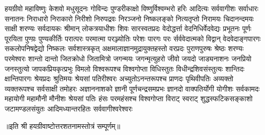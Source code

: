 
\twolineshloka
{हयग्रीवो महाविष्णुः केशवो मधुसूदनः}
{गोविन्दः पुण्डरीकाक्षो विष्णुर्विश्वम्भरो हरिः}
\twolineshloka
{आदित्यः सर्ववागीशः सर्वाधारः सनातनः}
{निराधारो निराकारो निरीशो निरुपद्रवः}
\twolineshloka
{निरञ्जनो  निष्कलङ्को नित्यतृप्तो निरामयः}
{चिदानन्दमयः साक्षी शरण्यः सर्वदायकः}
\twolineshloka
{श्रीमान् लोकत्रयाधीशः शिवः सारस्वतप्रदः}
{वेदोद्धर्त्ता वेदनिधिर्वेदवेद्यः प्रभूतनः}
\twolineshloka
{पूर्णः पूरयिता पुण्य़ः पुण्यकीर्तिः परात्परः}
{परमात्मा परञ्ज्योतिः परेशः पारगः परः}
\twolineshloka
{र्सर्ववेदात्मको विद्वान् वेदवेदाङ्गपारगः}
{सकलोपनिषद्वेद्यो निष्कलः सर्वशास्त्रकृत्}
\twolineshloka
{अक्षमालाज्ञानमुद्रायुक्तहस्तो वरप्रदः}
{पुराणपुरुषः श्रेष्ठः शरण्यः परमेश्वरः}
\twolineshloka
{शान्तो दान्तो जितक्रोधो जितामित्रो जगन्मयः}
{जगन्मृत्युहरो जीवो जयदो जाड्यनाशनः}
\twolineshloka
{जनप्रियो जनस्तुत्यो जापकप्रियकृत्प्रभुः}
{विमलो विश्वरूपश्च विश्वगोप्ता विधिस्तुतः}
\twolineshloka
{विधीन्द्रशिवसंस्तुत्यः शान्तिदः क्षान्तिपारगः}
{श्रेयप्रदः श्रुतिमयः श्रेयसां पतिरीश्वरः}
\twolineshloka
{अच्युतोऽनन्तरूपश्च प्राणदः पृथिवीपतिः}
{अव्यक्तो व्यक्तरूपश्च सर्वसाक्षी तमोहरः}
\twolineshloka
{अज्ञाननाशको ज्ञानी पूर्णचन्द्रसमप्रभः}
{ज्ञानदो वाक्पतिर्योगी योगीशः सर्वकामदः}
\twolineshloka
{महायोगी महामौनी मौनीशः श्रेयसां पतिः}
{हंसः परमहंसश्च विश्वगोप्ता विराट् स्वराट्}
\twolineshloka
{शुद्धस्फटिकसङ्काशो जटामण्डलसंयुतः}
{आदिमध्यान्तरहितः सर्ववागीश्वरेश्वरः}

॥इति श्री हयग्रीवाष्टोत्तरशतनामस्तोत्रं सम्पूर्णम्॥
